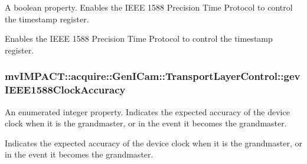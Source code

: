 A boolean property. Enables the I\+E\+E\+E 1588 Precision Time Protocol to control the timestamp register. 

Enables the I\+E\+E\+E 1588 Precision Time Protocol to control the timestamp register. \hypertarget{classmv_i_m_p_a_c_t_1_1acquire_1_1_gen_i_cam_1_1_transport_layer_control_a29019ba4360e2180931b939b6008d6d4}{
\subsubsection[{gev\+I\+E\+E\+E1588\+Clock\+Accuracy}]{ mv\+I\+M\+P\+A\+C\+T\+::acquire\+::\+Gen\+I\+Cam\+::\+Transport\+Layer\+Control\+::gev\+I\+E\+E\+E1588\+Clock\+Accuracy}}\label{classmv_i_m_p_a_c_t_1_1acquire_1_1_gen_i_cam_1_1_transport_layer_control_a29019ba4360e2180931b939b6008d6d4}


An enumerated integer property. Indicates the expected accuracy of the device clock when it is the grandmaster, or in the event it becomes the grandmaster. 

Indicates the expected accuracy of the device clock when it is the grandmaster, or in the event it becomes the grandmaster.

